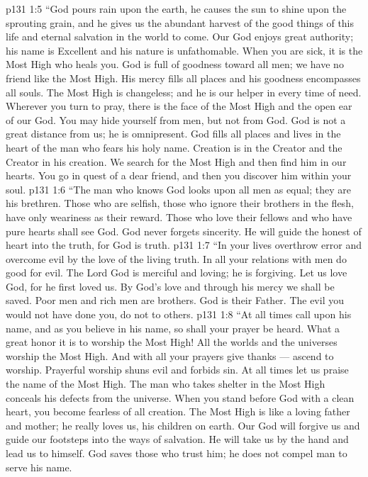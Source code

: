 \vs p131 1:5 “God pours rain upon the earth, he causes the sun to shine upon the sprouting grain, and he gives us the abundant harvest of the good things of this life and eternal salvation in the world to come. Our God enjoys great authority; his name is Excellent and his nature is unfathomable. When you are sick, it is the Most High who heals you. God is full of goodness toward all men; we have no friend like the Most High. His mercy fills all places and his goodness encompasses all souls. The Most High is changeless; and he is our helper in every time of need. Wherever you turn to pray, there is the face of the Most High and the open ear of our God. You may hide yourself from men, but not from God. God is not a great distance from us; he is omnipresent. God fills all places and lives in the heart of the man who fears his holy name. Creation is in the Creator and the Creator in his creation. We search for the Most High and then find him in our hearts. You go in quest of a dear friend, and then you discover him within your soul.
\vs p131 1:6 “The man who knows God looks upon all men as equal; they are his brethren. Those who are selfish, those who ignore their brothers in the flesh, have only weariness as their reward. Those who love their fellows and who have pure hearts shall see God. God never forgets sincerity. He will guide the honest of heart into the truth, for God is truth.
\vs p131 1:7 “In your lives overthrow error and overcome evil by the love of the living truth. In all your relations with men do good for evil. The Lord God is merciful and loving; he is forgiving. Let us love God, for he first loved us. By God’s love and through his mercy we shall be saved. Poor men and rich men are brothers. God is their Father. The evil you would not have done you, do not to others.
\vs p131 1:8 “At all times call upon his name, and as you believe in his name, so shall your prayer be heard. What a great honor it is to worship the Most High! All the worlds and the universes worship the Most High. And with all your prayers give thanks --- ascend to worship. Prayerful worship shuns evil and forbids sin. At all times let us praise the name of the Most High. The man who takes shelter in the Most High conceals his defects from the universe. When you stand before God with a clean heart, you become fearless of all creation. The Most High is like a loving father and mother; he really loves us, his children on earth. Our God will forgive us and guide our footsteps into the ways of salvation. He will take us by the hand and lead us to himself. God saves those who trust him; he does not compel man to serve his name.
